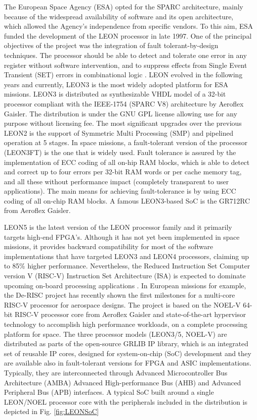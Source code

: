 The European Space Agency (ESA) opted for the SPARC architecture, mainly because of the widespread availability of software and its open architecture, which allowed the Agency's independence from specific vendors. To this aim, ESA funded the development of the LEON processor in late 1997. One of the principal objectives of the project was the integration of fault tolerant-by-design techniques. The processor should be able to detect and tolerate one error in any register without software intervention, and to suppress effects from  Single Event Transient (SET) errors in combinational logic \cite{Anrersson2010}. LEON evolved in the following years and currently, LEON3 \cite{leon3} is the most widely adopted platform for ESA missions. LEON3 is distributed as synthesizable VHDL model of a 32-bit processor compliant with the IEEE-1754 (SPARC V8) architecture by Aeroflex Gaisler. The distribution is under the GNU GPL license allowing use for any purpose without licensing fee. The most significant upgrades over the previous LEON2 is the support of Symmetric Multi Processing (SMP) and pipelined operation at 5 stages. In space missions, a fault-tolerant version of the processor (LEON3FT) is the one that is widely used. Fault tolerance is assured by the implementation of ECC coding of all on-hip RAM blocks, which is able to detect and correct up to four errors per 32-bit RAM words or per cache memory tag, and all these without performance impact (completely transparent to user applications). The main means for achieving fault-tolerance is by using ECC coding of all on-chip RAM blocks. A famous LEON3-based SoC is the GR712RC from Aeroflex Gaisler.\par 
LEON5 is the latest version of  the LEON processor family\cite{leon5} and it primarily targets high-end FPGA's. Although it has not yet been implemented in space missions, it provides backward compatibility for most of the software implementations that have targeted LEON3 and LEON4 processors, claiming up to 85\% higher performance. Nevertheless, the Reduced Instruction Set Computer version V (RISC-V) Instruction Set Architecture (ISA) is expected to dominate upcoming on-board processing applications \cite{DiMascio2020}. In European missions for example, the De-RISC project \cite{derisc2020} has recently shown the first milestones for a multi-core RISC-V processor for aerospace designs. The project is based on the NOEL-V 64-bit RISC-V processor core \cite{noelv} from Aeroflex Gaisler and state-of-the-art hypervisor technology to accomplish high performance workloads, on a complete processing platform for space. The three processor models (LEON3/5, NOEL-V) are distributed as parts of the open-source GRLIB IP library, which is an integrated set of reusable IP cores, designed for system-on-chip (SoC) development and they are available also in fault-tolerant versions for FPGA and ASIC implementations. Typically, they are interconnected through Advanced Microcontroller Bus Architecture (AMBA) Advanced High-performance Bus (AHB) and Advanced Peripheral Bus (APB) interfaces. A typical SoC built around a single LEON/NOEL processor core with the peripherals included in the distribution is depicted in Fig. \ref{fig:LEONSoC}\par
